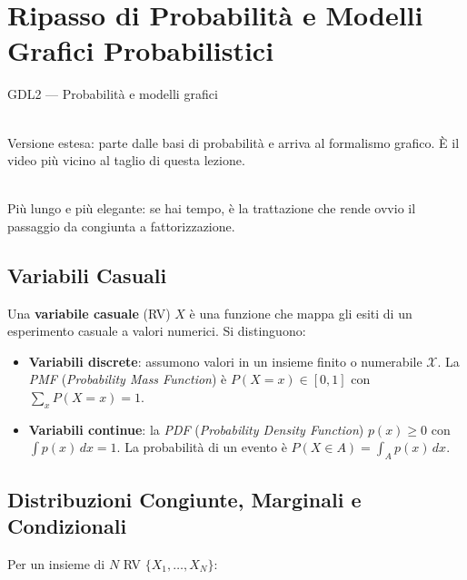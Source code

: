 \chapter{Ripasso di Probabilità e Modelli Grafici Probabilistici}

\begin{risorsevideo}{GDL2 — Probabilità e modelli grafici}

\medskip
{}\\
Versione estesa: parte dalle basi di probabilità e arriva al formalismo grafico. È il video più vicino al taglio di questa lezione.

\medskip
{}\\
Più lungo e più elegante: se hai tempo, è la trattazione che rende ovvio il passaggio da congiunta a fattorizzazione.
\end{risorsevideo}

\section{Variabili Casuali}

Una \textbf{variabile casuale} (RV) $X$ è una funzione che mappa gli esiti di un esperimento casuale a valori numerici. Si distinguono:

\begin{itemize}
    \item \textbf{Variabili discrete}: assumono valori in un insieme finito o numerabile $\mathcal{X}$. La \textit{PMF} (\textit{Probability Mass Function}) è $P(X{=}x) \in [0,1]$ con $\sum_{x} P(X{=}x) = 1$.
    \item \textbf{Variabili continue}: la \textit{PDF} (\textit{Probability Density Function}) $p(x) \geq 0$ con $\int p(x)\,dx = 1$. La probabilità di un evento è $P(X \in A) = \int_A p(x)\,dx$.
\end{itemize}

\section{Distribuzioni Congiunte, Marginali e Condizionali}

Per un insieme di $N$ RV $\{X_1, \ldots, X_N\}$:

